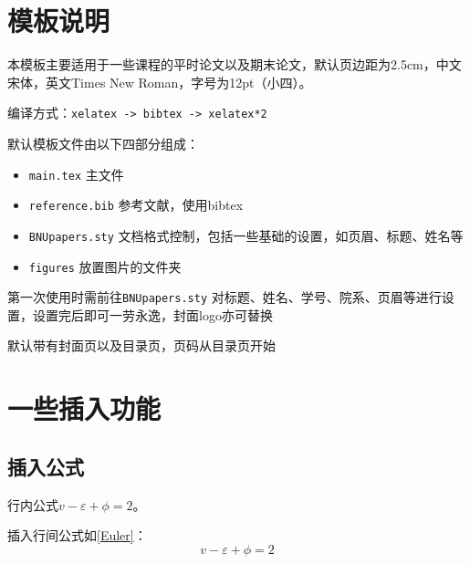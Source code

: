 \documentclass[12pt,hyperref,a4paper,UTF8]{ctexart}
\begin{document}
\cover

%
%

\thispagestyle{empty} %

\newpage
\tableofcontents

\newpage


\section{模板说明}
本模板主要适用于一些课程的平时论文以及期末论文，默认页边距为2.5cm，中文宋体，英文Times New Roman，字号为12pt（小四）。

编译方式：\verb|xelatex -> bibtex -> xelatex*2|


默认模板文件由以下四部分组成：
\begin{itemize}
    \item \texttt{main.tex} 主文件
    \item \texttt{reference.bib} 参考文献，使用bibtex
    \item \texttt{BNUpapers.sty} 文档格式控制，包括一些基础的设置，如页眉、标题、姓名等
    \item \texttt{figures} 放置图片的文件夹
\end{itemize}

第一次使用时需前往\texttt{BNUpapers.sty} 对标题、姓名、学号、院系、页眉等进行设置，设置完后即可一劳永逸，封面logo亦可替换

默认带有封面页以及目录页，页码从目录页开始

\section{一些插入功能}
\subsection{插入公式}
行内公式$v-\varepsilon+\phi=2$。

插入行间公式如\autoref{Euler}：
\begin{equation}
    v-\varepsilon+\phi=2
    \label{Euler}
\end{equation}
\end{document}
